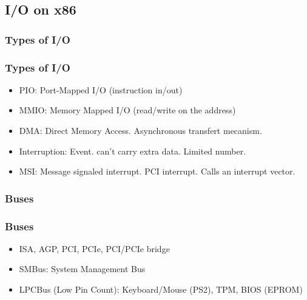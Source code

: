 \subsection{I/O on x86}
\subsubsection{Types of I/O}
        \begin{frame}
                \frametitle{Types of I/O}
                \begin{itemize}
                        \item PIO: Port-Mapped I/O (instruction in/out)
                        \item MMIO: Memory Mapped I/O (read/write on
                              the address)
                        \item DMA: Direct Memory Access. Asynchronous
                              transfert mecanism.
                        \item Interruption: Event. can't carry extra
                        data. Limited number.
                        \item MSI: Message signaled interrupt. PCI
                        interrupt. Calls an interrupt vector.
                \end{itemize}
        \end{frame}

\subsubsection{Buses}
        \begin{frame}
                \frametitle{Buses}
                \begin{itemize}
                        \item ISA, AGP, PCI, PCIe, PCI/PCIe bridge
                        \item SMBus: System Management Bus
                        \item LPCBus (Low Pin Count): Keyboard/Mouse (PS2), TPM, BIOS
                        (EPROM)
                \end{itemize}
        \end{frame}

